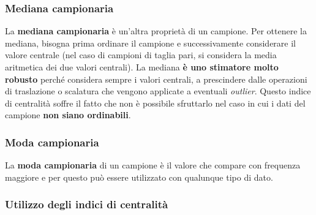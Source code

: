 \subsubsection{Mediana campionaria}
La \textbf{mediana campionaria} è un'altra proprietà di un campione.
Per ottenere la mediana, bisogna prima ordinare il campione e successivamente considerare il valore centrale (nel caso di campioni di taglia pari, si considera la media aritmetica dei due valori centrali).
\newline
\noindent La mediana \textbf{è uno stimatore molto robusto} perché considera sempre i valori centrali, a prescindere dalle operazioni di traslazione o scalatura che vengono applicate a eventuali  \textit{outlier}.
\newline
\noindent Questo indice di centralità soffre il fatto che non è possibile sfruttarlo nel caso in cui i dati del campione \textbf{non siano ordinabili}.

\subsubsection{Moda campionaria}
La \textbf{moda campionaria} di un campione è il valore che compare con frequenza maggiore e per questo può essere utilizzato con qualunque tipo di dato.

\subsubsection{Utilizzo degli indici di centralità}

